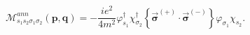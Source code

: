 \begin{equation}
\mathcal{M}_{s_{1}s_{2}\sigma _{1}\sigma _{2}}^{ann}(\mathbf{p},\mathbf{q})=-
\frac{ie^{2}}{4m^{2}}\varphi _{s_{1}}^{\dagger }\chi _{\sigma _{2}}^{\dagger
}\left\{ \overrightarrow{\mathbf{\sigma }}^{\left( +\right) }\cdot 
\overrightarrow{\mathbf{\sigma }}^{\left( -\right) }\right\} \varphi
_{\sigma _{1}}\chi _{s_{2}}.
\end{equation}

